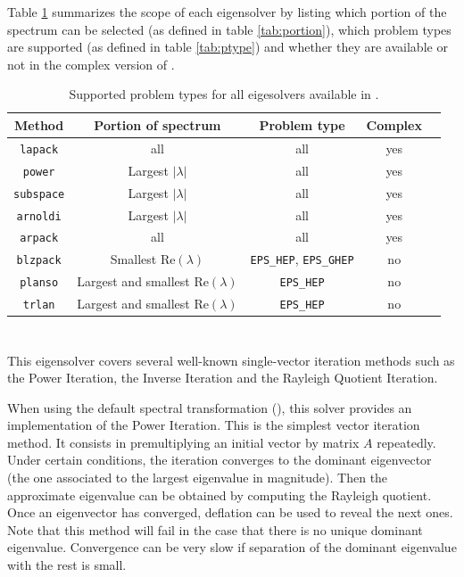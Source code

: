	Table \ref{tab:support} summarizes the scope of each eigensolver by listing which portion of the spectrum can be selected (as defined in table \ref{tab:portion}), which problem types are supported (as defined in table \ref{tab:ptype}) and whether they are available or not in the complex version of \slepc. 
\begin{table}
\centering
\begin{tabular}{ccccc} \hline
Method   &  Portion of spectrum & Problem type & Complex \\ \hline
\texttt{lapack}   &  all                 & all & yes \\ 
\texttt{power}    &  Largest $|\lambda|$ & all & yes \\ 
\texttt{subspace} &  Largest $|\lambda|$ & all & yes \\ 
\texttt{arnoldi}  &  Largest $|\lambda|$ & all & yes \\ 
\hline
\texttt{arpack}   &  all &  all & yes \\ 
\texttt{blzpack}  &  Smallest $\mathrm{Re}(\lambda)$ & \Verb!EPS_HEP!, \Verb!EPS_GHEP!  & no \\ 
\texttt{planso}   &  Largest and smallest $\mathrm{Re}(\lambda)$ & \Verb!EPS_HEP! & no \\ 
\texttt{trlan}    &  Largest and smallest $\mathrm{Re}(\lambda)$ & \Verb!EPS_HEP! & no \\ \hline
\end{tabular}
\caption{\label{tab:support}Supported problem types for all eigesolvers available in \slepc.}
\end{table}


\section{}

This eigensolver covers several well-known single-vector iteration methods such as the Power Iteration, the Inverse Iteration and the Rayleigh Quotient Iteration.

When using the default spectral transformation (), this solver provides an implementation of the Power Iteration. This is the simplest vector iteration method. It consists in premultiplying an initial vector by matrix $A$ repeatedly. Under certain conditions, the iteration converges to the dominant eigenvector (the one associated to the largest eigenvalue in magnitude). Then the approximate eigenvalue can be obtained by computing the Rayleigh quotient. Once an eigenvector has converged, deflation can be used to reveal the next ones. Note that this method will fail in the case that there is no unique dominant eigenvalue. Convergence can be very slow if separation of the dominant eigenvalue with the rest is small.

